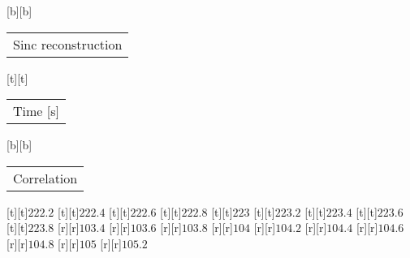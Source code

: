 %
%
[b][b]{\fontsize{8}{12}\selectfont \setlength{\tabcolsep}{0pt}\begin{tabular}{c}Sinc reconstruction\end{tabular}}%
[t][t]{\fontsize{8}{12}\selectfont \setlength{\tabcolsep}{0pt}\begin{tabular}{c}Time [s]\end{tabular}}%
[b][b]{\fontsize{8}{12}\selectfont \setlength{\tabcolsep}{0pt}\begin{tabular}{c}Correlation\end{tabular}}%
%
\fontsize{6}{8}%
\selectfont%
%
[t][t]{$222.2$}%
[t][t]{$222.4$}%
[t][t]{$222.6$}%
[t][t]{$222.8$}%
[t][t]{$223$}%
[t][t]{$223.2$}%
[t][t]{$223.4$}%
[t][t]{$223.6$}%
[t][t]{$223.8$}%
%
[r][r]{$103.4$}%
[r][r]{$103.6$}%
[r][r]{$103.8$}%
[r][r]{$104$}%
[r][r]{$104.2$}%
[r][r]{$104.4$}%
[r][r]{$104.6$}%
[r][r]{$104.8$}%
[r][r]{$105$}%
[r][r]{$105.2$}%
%
%
